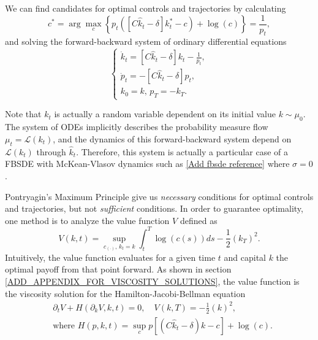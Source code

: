 We can find candidates for optimal controls and trajectories by calculating
\begin{equation*}
    c^* = \arg\max_c  \left\{ p_t\left( \left[C {\hat k_t} - \delta \right]k^*_t - c \right) + \log(c) \right\} = \frac{1}{p_t},
\end{equation*}
and solving the forward-backward system of ordinary differential equations
\begin{equation}\label{economic_example:ode_formulation}
    \begin{cases}
         \dot k_t = \left[ C {\hat k_t} - \delta \right] k_t - \frac{1}{p_t},\\
         \dot p_t = -  \left[C{\hat k_t} - \delta \right] p_t, \\
         k_0 = k,\, p_T =  - k_T.         
    \end{cases}
\end{equation}
\begin{remark}
    Note that $k_t$ is actually a random variable dependent on its initial value $k\sim \mu_0$.
    The system of ODEs implicitly describes the probability measure flow $\mu_t = \mathcal{L}(k_t)$,
    and the dynamics of this forward-backward system depend on $\mathcal{L}(k_t)$ through $\hat k_t$.
    Therefore, this system is actually a particular case of a FBSDE with McKean-Vlasov dynamics such as
    \ref{Add fbsde reference} where $\sigma = 0$.
\end{remark}
    Pontryagin's Maximum Principle give us \textit{necessary} conditions for optimal controls and trajectories, but not \textit{sufficient} conditions.
    In order to guarantee optimality, one method is to analyze the value function $V$ defined as
\begin{equation}\label{economic_example:value_function_definition}
    V(k,t) = \sup_{c_{(\cdot)},\, k_t = k} \int_t^T \log(c(s)) ds -\frac{1}{2}(k_T)^2.
\end{equation}
Intuitively, the value function evaluates for a given time $t$ and capital $k$ the optimal payoff from that point forward.
As shown in section \ref{ADD_APPENDIX_FOR_VISCOSITY_SOLUTIONS}, the value function is the viscosity solution for the Hamilton-Jacobi-Bellman equation
\begin{equation}\label{economic_example:hjb_equation_reduced}
    \begin{split}
        &\partial_t V + H(\partial_k V, k,t) = 0,\quad V(k,T) = -\frac{1}{2}(k)^2,\\
        &\text{where }
        H(p,k,t) = \sup_{c} p\left[ \left(C {\hat k_t - \delta}\right)k - c \right] + \log(c).
    \end{split}
\end{equation}
